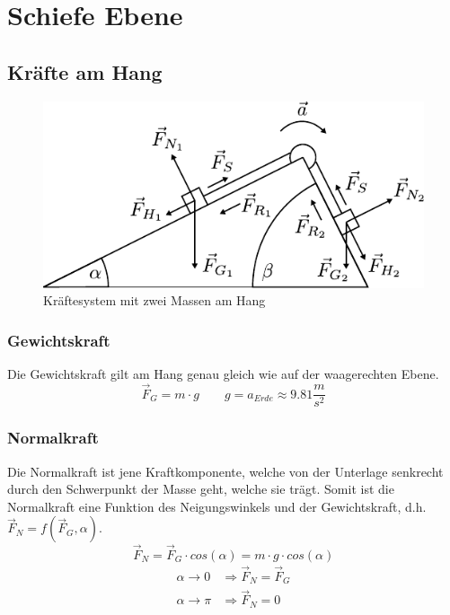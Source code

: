 \chapter{Schiefe Ebene}

\section{Kräfte am Hang}
\begin{figure}[h!]
	\centering
	\includegraphics[scale=1]{schiefe-ebene-1.pdf}
	\caption{Kräftesystem mit zwei Massen am Hang}
	\label{fig:hangsystem}
\end{figure}

\subsection{Gewichtskraft}
Die Gewichtskraft gilt am Hang genau gleich wie auf der waagerechten Ebene.
\[ \boxed{\vec{F}_G = m \cdot g} \qquad g = a_{Erde} \approx 9.81\frac{m}{s^2} \]

\subsection{Normalkraft}
Die Normalkraft ist jene Kraftkomponente, welche von der Unterlage senkrecht
durch den Schwerpunkt der Masse geht, welche sie trägt. Somit ist die 
Normalkraft eine Funktion des Neigungswinkels und der Gewichtskraft, d.h.
$\vec{F}_N = f(\vec{F}_G, \alpha)$.
\[ \boxed{ \vec{F}_N = \vec{F}_G \cdot cos(\alpha) = m \cdot g \cdot cos(\alpha)} \]
\[ \begin{array}{ll}
	\alpha \rightarrow 0 & \Rightarrow \vec{F}_N = \vec{F}_G \\
	\alpha \rightarrow \pi & \Rightarrow \vec{F}_N = 0
\end{array} \]

